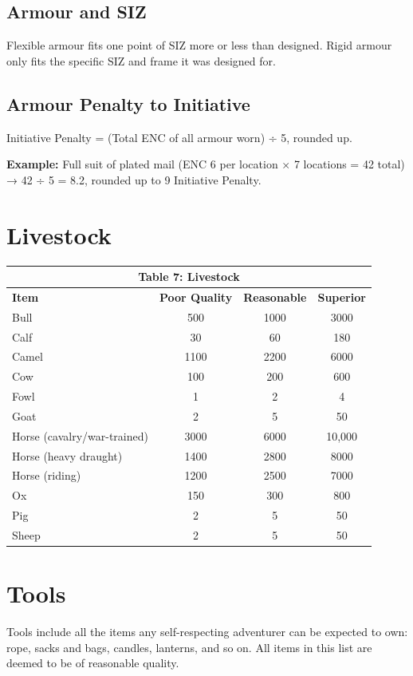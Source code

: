\documentclass[10pt]{article}
\begin{document}
\subsection{Armour and SIZ}
\label{sec:armour-siz}

Flexible armour fits one point of SIZ more or less than designed. Rigid armour only fits the specific SIZ and frame it was designed for.

\subsection{Armour Penalty to Initiative}
\label{sec:armour-penalty}

Initiative Penalty = (Total ENC of all armour worn) ÷ 5, rounded up.

\textbf{Example:} Full suit of plated mail (ENC 6 per location × 7 locations = 42 total) → 42 ÷ 5 = 8.2, rounded up to 9 Initiative Penalty.

\section{Livestock}
\label{sec:livestock}

\begin{longtable}[c]{|l|c|c|c|}
\hline
\multicolumn{4}{|c|}{\textbf{Table 7: Livestock}} \\
\hline
\textbf{Item} & \textbf{Poor Quality} & \textbf{Reasonable} & \textbf{Superior} \\
\hline
Bull & 500 & 1000 & 3000 \\
\hline
Calf & 30 & 60 & 180 \\
\hline
Camel & 1100 & 2200 & 6000 \\
\hline
Cow & 100 & 200 & 600 \\
\hline
Fowl & 1 & 2 & 4 \\
\hline
Goat & 2 & 5 & 50 \\
\hline
Horse (cavalry/war-trained) & 3000 & 6000 & 10,000 \\
\hline
Horse (heavy draught) & 1400 & 2800 & 8000 \\
\hline
Horse (riding) & 1200 & 2500 & 7000 \\
\hline
Ox & 150 & 300 & 800 \\
\hline
Pig & 2 & 5 & 50 \\
\hline
Sheep & 2 & 5 & 50 \\
\hline
\end{longtable}

\section{Tools}
\label{sec:tools}
Tools include all the items any self-respecting adventurer can be
expected to own: rope, sacks and bags, candles, lanterns, and so on.
All items in this list are deemed to be of reasonable quality.
\end{document}

